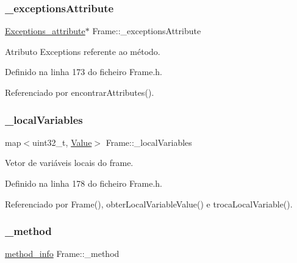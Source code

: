 \mbox{\label{classFrame_a5e98b7eb6642b16c03a75ec1f96c4fc4}} 
\subsubsection{\texorpdfstring{\+\_\+exceptions\+Attribute}{\_exceptionsAttribute}}
{\footnotesize\ttfamily \hyperlink{structExceptions__attribute}{Exceptions\+\_\+attribute}$\ast$ Frame\+::\+\_\+exceptions\+Attribute\hspace{0.3cm}{\ttfamily [private]}}

Atributo Exceptions referente ao método. 

Definido na linha 173 do ficheiro Frame.\+h.



Referenciado por encontrar\+Attributes().

\mbox{\label{classFrame_af9a215cbac749f3f51e1e7fe239f2010}} 
\subsubsection{\texorpdfstring{\+\_\+local\+Variables}{\_localVariables}}
{\footnotesize\ttfamily map$<$uint32\+\_\+t, \hyperlink{structValue}{Value}$>$ Frame\+::\+\_\+local\+Variables\hspace{0.3cm}{\ttfamily [private]}}

Vetor de variáveis locais do frame. 

Definido na linha 178 do ficheiro Frame.\+h.



Referenciado por Frame(), obter\+Local\+Variable\+Value() e troca\+Local\+Variable().

\mbox{\label{classFrame_af9658f71efb91988fa39a224ce9ec9c6}} 
\subsubsection{\texorpdfstring{\+\_\+method}{\_method}}
{\footnotesize\ttfamily \hyperlink{structmethod__info}{method\+\_\+info} Frame\+::\+\_\+method\hspace{0.3cm}{\ttfamily [private]}}

